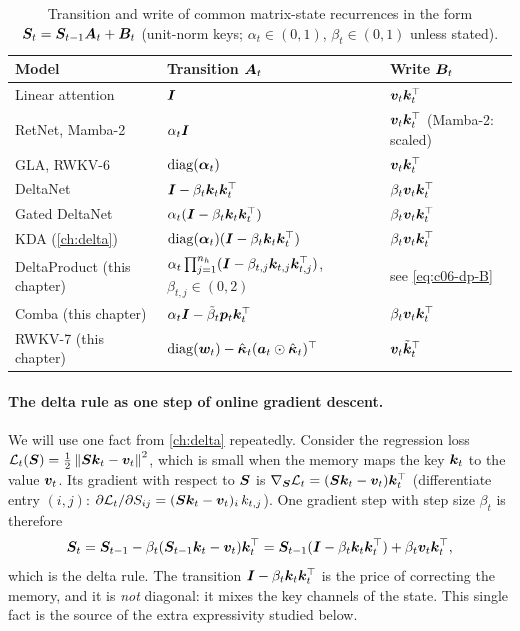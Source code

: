 \begin{table}[t]
\centering\small
\caption{Transition and write of common matrix-state recurrences in the form
$\bm{S}_t=\bm{S}_{t-1}\bm{A}_t+\bm{B}_t$ (unit-norm keys; $\alpha_t\in(0,1)$, $\beta_t\in(0,1)$ unless
stated).}
\label{tab:c06-transitions}
\begin{tabular}{@{}lll@{}}
\toprule
Model & Transition $\bm{A}_t$ & Write $\bm{B}_t$ \\
\midrule
Linear attention & $\bm{I}$ & $\bm{v}_t\bm{k}_t^{\top}$ \\
RetNet, Mamba-2 & $\alpha_t\bm{I}$ & $\bm{v}_t\bm{k}_t^{\top}$ (Mamba-2: scaled) \\
GLA, RWKV-6 & $\operatorname{diag}(\bm{\alpha}_t)$ & $\bm{v}_t\bm{k}_t^{\top}$ \\
DeltaNet & $\bm{I}-\beta_t\bm{k}_t\bm{k}_t^{\top}$ & $\beta_t\bm{v}_t\bm{k}_t^{\top}$ \\
Gated DeltaNet & $\alpha_t(\bm{I}-\beta_t\bm{k}_t\bm{k}_t^{\top})$ & $\beta_t\bm{v}_t\bm{k}_t^{\top}$ \\
KDA (\cref{ch:delta}) & $\operatorname{diag}(\bm{\alpha}_t)(\bm{I}-\beta_t\bm{k}_t\bm{k}_t^{\top})$ & $\beta_t\bm{v}_t\bm{k}_t^{\top}$ \\
\midrule
DeltaProduct (this chapter) & $\alpha_t\prod_{j=1}^{n_h}(\bm{I}-\beta_{t,j}\bm{k}_{t,j}\bm{k}_{t,j}^{\top})$, $\beta_{t,j}\in(0,2)$ & see \eqref{eq:c06-dp-B} \\
Comba (this chapter) & $\alpha_t\bm{I}-\tilde\beta_t\bm{p}_t\bm{k}_t^{\top}$ & $\beta_t\bm{v}_t\bm{k}_t^{\top}$ \\
RWKV-7 (this chapter) & $\operatorname{diag}(\bm{w}_t)-\hat{\bm\kappa}_t(\bm{a}_t\odot\hat{\bm\kappa}_t)^{\top}$ & $\bm{v}_t\tilde{\bm{k}}_t^{\top}$ \\
\bottomrule
\end{tabular}
\end{table}

\paragraph{The delta rule as one step of online gradient descent.}
We will use one fact from \cref{ch:delta} repeatedly. Consider the regression loss
$\mathcal{L}_t(\bm{S})=\tfrac12\left\lVert \bm{S}\bm{k}_t-\bm{v}_t\right\rVert^2$, which is small when the memory maps the key
$\bm{k}_t$ to the value $\bm{v}_t$. Its gradient with respect to $\bm{S}$ is
$\nabla_{\bm{S}}\mathcal{L}_t=(\bm{S}\bm{k}_t-\bm{v}_t)\bm{k}_t^{\top}$ (differentiate entry $(i,j)$:
$\partial\mathcal{L}_t/\partial S_{ij}=(\bm{S}\bm{k}_t-\bm{v}_t)_i\,k_{t,j}$). One gradient step with step
size $\beta_t$ is therefore
\begin{equation}\label{eq:c06-delta-gd}
  \bm{S}_t=\bm{S}_{t-1}-\beta_t(\bm{S}_{t-1}\bm{k}_t-\bm{v}_t)\bm{k}_t^{\top}
       =\bm{S}_{t-1}(\bm{I}-\beta_t\bm{k}_t\bm{k}_t^{\top})+\beta_t\bm{v}_t\bm{k}_t^{\top} ,
\end{equation}
which is the delta rule. The transition $\bm{I}-\beta_t\bm{k}_t\bm{k}_t^{\top}$ is the price of
correcting the memory, and it is \emph{not} diagonal: it mixes the key channels of the
state. This single fact is the source of the extra expressivity studied below.

